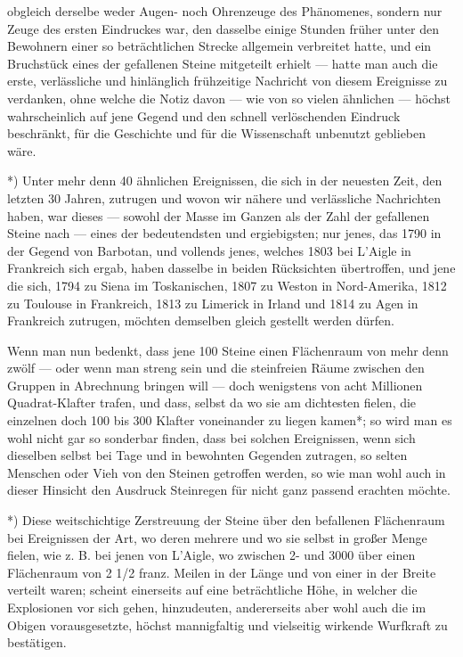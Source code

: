 \documentclass[a4paper, 11pt, oneside, german]{article}
\begin{document}
obgleich derselbe weder Augen- noch Ohrenzeuge des Phänomenes, sondern nur Zeuge des ersten Eindruckes war, den dasselbe einige Stunden früher unter den Bewohnern einer so beträchtlichen Strecke allgemein verbreitet hatte, und ein Bruchstück eines der gefallenen Steine mitgeteilt erhielt --- hatte man auch die erste, verlässliche und hinlänglich frühzeitige Nachricht von diesem Ereignisse zu verdanken, ohne welche die Notiz davon --- wie von so vielen ähnlichen --- höchst wahrscheinlich auf jene Gegend und den schnell verlöschenden Eindruck beschränkt, für die Geschichte und für die Wissenschaft unbenutzt geblieben wäre.

*) Unter mehr denn 40 ähnlichen Ereignissen, die sich in der neuesten Zeit, den letzten 30 Jahren, zutrugen und wovon wir nähere und verlässliche Nachrichten haben, war dieses --- sowohl der Masse im Ganzen als der Zahl der gefallenen Steine nach --- eines der bedeutendsten und ergiebigsten; nur jenes, das 1790 in der Gegend von Barbotan, und vollends jenes, welches 1803 bei L'Aigle in Frankreich sich ergab, haben dasselbe in beiden Rücksichten übertroffen, und jene die sich, 1794 zu Siena im Toskanischen, 1807 zu Weston in Nord-Amerika, 1812 zu Toulouse in Frankreich, 1813 zu Limerick in Irland und 1814 zu Agen in Frankreich zutrugen, möchten demselben gleich gestellt werden dürfen.

Wenn man nun bedenkt, dass jene 100 Steine einen Flächenraum von mehr denn zwölf --- oder wenn man streng sein und die steinfreien Räume zwischen den Gruppen in Abrechnung bringen will --- doch wenigstens von acht Millionen Quadrat-Klafter trafen, und dass, selbst da wo sie am dichtesten fielen, die einzelnen doch 100 bis 300 Klafter voneinander zu liegen kamen*; so wird man es wohl nicht gar so sonderbar finden, dass bei solchen Ereignissen, wenn sich dieselben selbst bei Tage und in bewohnten Gegenden zutragen, so selten Menschen oder Vieh von den Steinen getroffen werden, so wie man wohl auch in dieser Hinsicht den Ausdruck Steinregen für nicht ganz passend erachten möchte.

*) Diese weitschichtige Zerstreuung der Steine über den befallenen Flächenraum bei Ereignissen der Art, wo deren mehrere und wo sie selbst in großer Menge fielen, wie z. B. bei jenen von L'Aigle, wo zwischen 2- und 3000 über einen Flächenraum von 2 1/2 franz. Meilen in der Länge und von einer in der Breite verteilt waren; scheint einerseits auf eine beträchtliche Höhe, in welcher die Explosionen vor sich gehen, hinzudeuten, andererseits aber wohl auch die im Obigen vorausgesetzte, höchst mannigfaltig und vielseitig wirkende Wurfkraft zu bestätigen.
\end{document}
